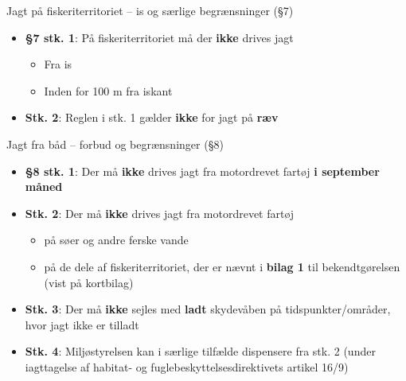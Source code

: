 \begin{frame}{Jagt på fiskeriterritoriet – is og særlige begrænsninger (§7)}
    \begin{itemize}
        \item \textbf{§7 stk. 1}: På fiskeriterritoriet må der \textbf{ikke} drives jagt
          \begin{itemize}
            \item Fra is
            \item Inden for 100 m fra iskant
          \end{itemize}
        \item \textbf{Stk. 2}: Reglen i stk. 1 gælder \textbf{ikke} for jagt på \textbf{ræv}
    \end{itemize}
\end{frame}



\begin{frame}{Jagt fra båd – forbud og begrænsninger (§8)}
    \begin{itemize}
        \item \textbf{§8 stk. 1}: Der må \textbf{ikke} drives jagt fra motordrevet fartøj \textbf{i september måned}
        \item \textbf{Stk. 2}: Der må \textbf{ikke} drives jagt fra motordrevet fartøj
          \begin{itemize}
            \item på søer og andre ferske vande
            \item på de dele af fiskeriterritoriet, der er nævnt i \textbf{bilag 1} til bekendtgørelsen (vist på kortbilag)
          \end{itemize}
        \item \textbf{Stk. 3}: Der må \textbf{ikke} sejles med \textbf{ladt} skydevåben på tidspunkter/områder, hvor jagt ikke er tilladt
        \item \textbf{Stk. 4}: Miljøstyrelsen kan i særlige tilfælde dispensere fra stk. 2 (under iagttagelse af habitat- og fuglebeskyttelsesdirektivets artikel 16/9)
    \end{itemize}
\end{frame}

